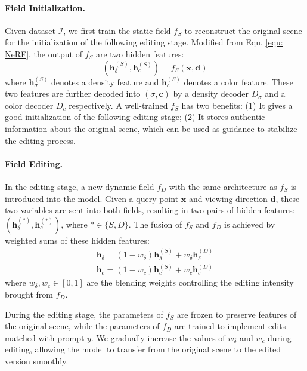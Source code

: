 \paragraph{Field Initialization.}
Given dataset $\mathcal{I}$, we first train the static field $f_S$ to reconstruct the original scene for the initialization of the following editing stage. Modified from Equ. \ref{equ: NeRF}, the output of $f_S$ are two hidden features:
\begin{equation}
    (\mathbf{h}_{\delta}^{(S)}, \mathbf{h}_{c}^{(S)}) = f_S(\mathbf{x}, \mathbf{d})
\end{equation}
where $\mathbf{h}^{(S)}_{\sigma}$ denotes a density feature and $\mathbf{h}^{(S)}_{c}$ denotes a color feature. These two features are further decoded into $(\sigma, \mathbf{c})$ by a density decoder $D_{\sigma}$ and a color decoder $D_{c}$ respectively.
A well-trained $f_S$ has two benefits: (1) It gives a good initialization of the following editing stage; (2) It stores authentic information about the original scene, which can be used as guidance to stabilize the editing process.

\paragraph{Field Editing.}
In the editing stage, a new dynamic field $f_D$ with the same architecture as $f_S$ is introduced into the model.
Given a query point $\mathbf{x}$ and viewing direction $\mathbf{d}$, these two variables are sent into both fields, resulting in two pairs of hidden features: $(\mathbf{h}_{\delta}^{(*)}, \mathbf{h}_{c}^{(*)})$, where $* \in \{S, D\}$.
The fusion of $f_S$ and $f_D$ is achieved by weighted sums of these hidden features:
\begin{align}
\mathbf{h}_{\delta} = (1 - w_{\delta})\mathbf{h}_{\delta}^{(S)} + w_{\delta}\mathbf{h}_{\delta}^{(D)} \\
\mathbf{h}_{c} = (1 - w_{c})\mathbf{h}_{c}^{(S)} + w_{c}\mathbf{h}_{c}^{(D)}
\end{align}
where $w_{\delta}, w_{c} \in [0, 1]$ are the blending weights controlling the editing intensity brought from $f_D$. 

During the editing stage, the parameters of $f_S$ are frozen to preserve features of the original scene, while the parameters of $f_D$ are trained to implement edits matched with prompt $y$. We gradually increase the values of $w_{\delta}$ and $w_{c}$ during editing, allowing the model to transfer from the original scene to the edited version smoothly.

